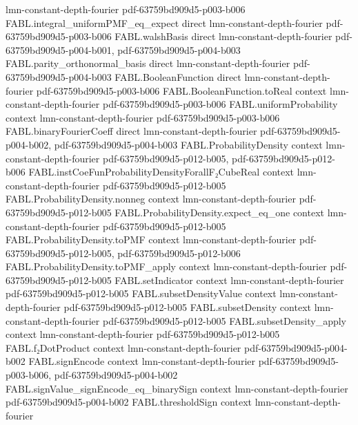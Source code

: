 \begin{theorem}
  {lmn-constant-depth-fourier}
  {pdf-63759bd909d5-p003-b006}
\proofstep
  {FABL.integral_uniformPMF_eq_expect}
  {direct}
  {lmn-constant-depth-fourier}
  {pdf-63759bd909d5-p003-b006}
\proofstep
  {FABL.walshBasis}
  {direct}
  {lmn-constant-depth-fourier}
  {pdf-63759bd909d5-p004-b001,
    pdf-63759bd909d5-p004-b003}
\proofstep
  {FABL.parity_orthonormal_basis}
  {direct}
  {lmn-constant-depth-fourier}
  {pdf-63759bd909d5-p004-b003}
\proofstep
  {FABL.BooleanFunction}
  {direct}
  {lmn-constant-depth-fourier}
  {pdf-63759bd909d5-p003-b006}
\proofstep
  {FABL.BooleanFunction.toReal}
  {context}
  {lmn-constant-depth-fourier}
  {pdf-63759bd909d5-p003-b006}
\proofstep
  {FABL.uniformProbability}
  {context}
  {lmn-constant-depth-fourier}
  {pdf-63759bd909d5-p003-b006}
\proofstep
  {FABL.binaryFourierCoeff}
  {direct}
  {lmn-constant-depth-fourier}
  {pdf-63759bd909d5-p004-b002,
    pdf-63759bd909d5-p004-b003}
\proofstep
  {FABL.ProbabilityDensity}
  {context}
  {lmn-constant-depth-fourier}
  {pdf-63759bd909d5-p012-b005,
    pdf-63759bd909d5-p012-b006}
\proofstep
  {FABL.instCoeFunProbabilityDensityForallF₂CubeReal}
  {context}
  {lmn-constant-depth-fourier}
  {pdf-63759bd909d5-p012-b005}
\proofstep
  {FABL.ProbabilityDensity.nonneg}
  {context}
  {lmn-constant-depth-fourier}
  {pdf-63759bd909d5-p012-b005}
\proofstep
  {FABL.ProbabilityDensity.expect_eq_one}
  {context}
  {lmn-constant-depth-fourier}
  {pdf-63759bd909d5-p012-b005}
\proofstep
  {FABL.ProbabilityDensity.toPMF}
  {context}
  {lmn-constant-depth-fourier}
  {pdf-63759bd909d5-p012-b005,
    pdf-63759bd909d5-p012-b006}
\proofstep
  {FABL.ProbabilityDensity.toPMF_apply}
  {context}
  {lmn-constant-depth-fourier}
  {pdf-63759bd909d5-p012-b005}
\proofstep
  {FABL.setIndicator}
  {context}
  {lmn-constant-depth-fourier}
  {pdf-63759bd909d5-p012-b005}
\proofstep
  {FABL.subsetDensityValue}
  {context}
  {lmn-constant-depth-fourier}
  {pdf-63759bd909d5-p012-b005}
\proofstep
  {FABL.subsetDensity}
  {context}
  {lmn-constant-depth-fourier}
  {pdf-63759bd909d5-p012-b005}
\proofstep
  {FABL.subsetDensity_apply}
  {context}
  {lmn-constant-depth-fourier}
  {pdf-63759bd909d5-p012-b005}
\proofstep
  {FABL.f₂DotProduct}
  {context}
  {lmn-constant-depth-fourier}
  {pdf-63759bd909d5-p004-b002}
\proofstep
  {FABL.signEncode}
  {context}
  {lmn-constant-depth-fourier}
  {pdf-63759bd909d5-p003-b006,
    pdf-63759bd909d5-p004-b002}
\proofstep
  {FABL.signValue_signEncode_eq_binarySign}
  {context}
  {lmn-constant-depth-fourier}
  {pdf-63759bd909d5-p004-b002}
\proofstep
  {FABL.thresholdSign}
  {context}
  {lmn-constant-depth-fourier}

\end{theorem}

